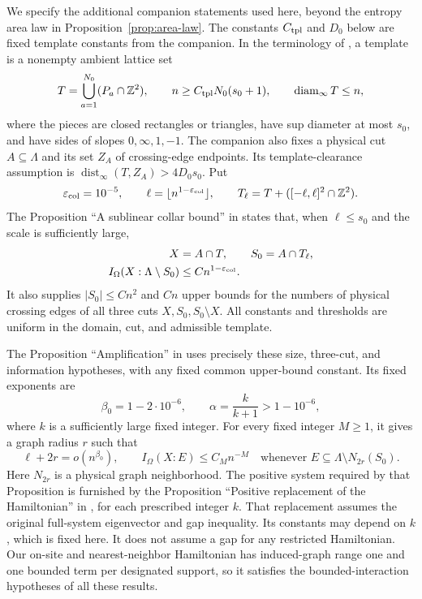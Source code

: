 \documentclass[11pt]{article}
\numberwithin{equation}{section}
\theoremstyle{definition}
\theoremstyle{remark}
\begin{document}
We specify the additional companion statements used here, beyond the
entropy area law in Proposition~\ref{prop:area-law}.  The constants
$C_{\rm tpl}$ and $D_0$ below are fixed template constants from the companion.
In the terminology
of \cite[Sections~9 and~10]{RepoAreaLaw}, a template is a nonempty ambient
lattice set
\[
 T=\bigcup_{a=1}^{N_0}(P_a\cap\mathbb Z^2),
 \qquad
 n\ge C_{\rm tpl}N_0(s_0+1),
 \qquad \operatorname{diam}_\infty T\le n,
\]
where the pieces are closed rectangles or triangles, have sup diameter
at most $s_0$, and have sides of slopes $0,\infty,1,-1$.  The companion also
fixes a physical cut $A\subseteq\Lambda$ and its set $Z_A$ of
crossing-edge endpoints.  Its template-clearance assumption is
$\operatorname{dist}_\infty(T,Z_A)>4D_0s_0$.  Put
\[
 \varepsilon_{\rm col}=10^{-5},\qquad
 \ell=\lfloor n^{1-\varepsilon_{\rm col}}\rfloor,
 \qquad T_\ell=T+([-\ell,\ell]^2\cap\mathbb Z^2).
\]
The Proposition ``A sublinear collar bound'' in
\cite[Section~9]{RepoAreaLaw} states that, when $\ell\le s_0$ and the
scale is sufficiently large,
\begin{equation}
 \begin{split}
 X&=A\cap T,\qquad S_0=A\cap T_\ell,\\
 I_\Omega(X:\Lambda\setminus S_0)&\le Cn^{1-\varepsilon_{\rm col}}.
 \end{split}
 \label{eq:info-repository-collar}
\end{equation}
It also supplies $|S_0|\le Cn^2$ and $Cn$ upper bounds for the numbers
of physical crossing edges of all three cuts $X,S_0,S_0\setminus X$.
All constants and thresholds are uniform in the domain, cut, and
admissible template.

The Proposition ``Amplification'' in \cite[Section~10]{RepoAreaLaw}
uses precisely these size, three-cut, and information hypotheses, with
any fixed common upper-bound constant.  Its fixed exponents are
\[
 \beta_0=1-2\cdot10^{-6},\qquad
 \alpha=\frac{k}{k+1}>1-10^{-6},
\]
where $k$ is a sufficiently large fixed integer.  For every fixed integer
$M\ge1$, it gives a graph radius $r$ such that
\begin{equation}
 \ell+2r=o(n^{\beta_0}),\qquad
 I_\Omega(X:E)\le C_Mn^{-M}
 \quad\text{whenever }E\subseteq\Lambda\setminus N_{2r}(S_0).
 \label{eq:info-repository-amplification}
\end{equation}
Here $N_{2r}$ is a physical graph neighborhood.  The positive system
required by that Proposition is furnished by the Proposition ``Positive
replacement of the Hamiltonian'' in \cite[Section~4]{RepoAreaLaw}, for
each prescribed integer $k$.  That replacement assumes the original
full-system eigenvector and gap inequality.  Its constants may depend
on $k$, which is fixed here.  It does not assume a gap for any restricted
Hamiltonian.  Our on-site and nearest-neighbor Hamiltonian has
induced-graph range one and one bounded term per designated support, so
it satisfies the bounded-interaction hypotheses of all these results.
\end{document}
